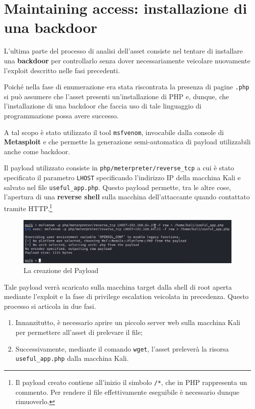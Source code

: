 \documentclass[a4paper, 12pt, oneside]{article}
\begin{document}
\newpage
\section{Maintaining access: installazione di una backdoor}
L'ultima parte del processo di analisi dell'asset consiste nel tentare di installare una \textbf{backdoor} per controllarlo senza dover necessariamente veicolare nuovamente l'exploit descritto nelle fasi precedenti.

Poiché nella fase di enumerazione era stata riscontrata la presenza di pagine \texttt{.php} si può assumere che l'asset presenti un'installazione di PHP e, dunque, che l'installazione di una backdoor che faccia uso di tale linguaggio di programmazione possa avere successo.

A tal scopo è stato utilizzato il tool \texttt{msfvenom}, invocabile dalla console di \textbf{Metasploit} e che permette la generazione semi-automatica di payload utilizzabili anche come backdoor.\cite{msfvenom}

Il payload utilizzato consiste in \texttt{php/meterpreter/reverse\_tcp} a cui è stato specificato il parametro \texttt{LHOST} specificando l'indirizzo IP della macchina Kali e salvato nel file \texttt{useful\_app.php}. Questo payload permette, tra le altre cose, l'apertura di una \textbf{reverse shell} sulla macchina dell'attaccante quando contattato tramite HTTP.\footnote{Il payload creato contiene all'inizio il simbolo \texttt{/*}, che in PHP rappresenta un commento. Per rendere il file effettivamente eseguibile è necessario dunque rimuoverlo.}

\begin{figure}[h!]
    \centering
    \includegraphics[width=\textwidth]{img/msfvenom.png}
    \caption{La creazione del Payload}
\end{figure}

Tale payload verrà scaricato sulla macchina target dalla shell di root aperta mediante l'exploit e la fase di privilege escalation veicolata in precedenza. Questo processo si articola in due fasi.

\begin{enumerate}
    \item Innanzitutto, è necessario aprire un piccolo server web sulla macchina Kali per permettere all'asset di prelevare il file;
    \item Successivamente, mediante il comando \texttt{wget}, l'asset preleverà la risorsa \texttt{useful\_app.php} dalla macchina Kali.
\end{enumerate}
\end{document}

